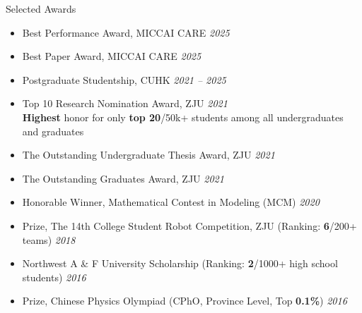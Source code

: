 \documentclass[a4paper]{resume} %
\begin{document}
\begin{rSection}{Selected Awards} 
\begin{itemize}
	\item Best Performance Award,  MICCAI CARE \hfill{\it 2025}
	\item Best Paper Award,  MICCAI CARE \hfill{\it 2025}
	\item Postgraduate Studentship, CUHK \hfill{\it 2021 -- 2025}
	\item Top 10 Research Nomination Award, ZJU \hfill{\it 2021}
	\\ {\bf Highest} honor for only {\bf top 20}/50k+ students among all undergraduates and graduates
	\item The Outstanding Undergraduate Thesis Award, ZJU \hfill{\it 2021}
	\item The Outstanding Graduates Award, ZJU \hfill{\it 2021}
   	\item Honorable Winner, Mathematical Contest in Modeling (MCM) \hfill{\it 2020}
 	\item {} Prize, The 14th College Student Robot Competition, ZJU (Ranking: {\bf 6}/200+ teams) \hfill{\it 2018}
 	\item Northwest A \& F University Scholarship (Ranking: {\bf 2}/1000+ high school students) \hfill{\it 2016}
 	\item {} Prize, Chinese Physics Olympiad (CPhO, Province Level, Top {\bf 0.1\%}) \hfill{\it 2016}
\end{itemize}
\end{rSection}









\end{document}
